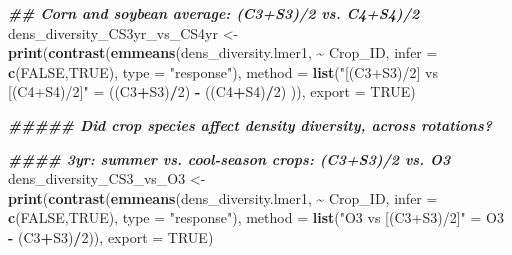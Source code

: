\documentclass[
]{article}
\newenvironment{Shaded}{\begin{snugshade}}{\end{snugshade}}
\newcommand{\AttributeTok}[1]{\textcolor[rgb]{0.13,0.29,0.53}{#1}}
\newcommand{\ConstantTok}[1]{\textcolor[rgb]{0.56,0.35,0.01}{#1}}
\newcommand{\DecValTok}[1]{\textcolor[rgb]{0.00,0.00,0.81}{#1}}
\newcommand{\DocumentationTok}[1]{\textcolor[rgb]{0.56,0.35,0.01}{\textbf{\textit{#1}}}}
\newcommand{\FunctionTok}[1]{\textcolor[rgb]{0.13,0.29,0.53}{\textbf{#1}}}
\newcommand{\NormalTok}[1]{#1}
\newcommand{\OtherTok}[1]{\textcolor[rgb]{0.56,0.35,0.01}{#1}}
\newcommand{\SpecialCharTok}[1]{\textcolor[rgb]{0.81,0.36,0.00}{\textbf{#1}}}
\newcommand{\StringTok}[1]{\textcolor[rgb]{0.31,0.60,0.02}{#1}}
\begin{document}
\begin{Shaded}
\begin{Highlighting}[]
\DocumentationTok{\#\# Corn and soybean average: (C3+S3)/2 vs. C4+S4)/2}
\NormalTok{dens\_diversity\_CS3yr\_vs\_CS4yr }\OtherTok{\textless{}{-}} \FunctionTok{print}\NormalTok{(}\FunctionTok{contrast}\NormalTok{(}\FunctionTok{emmeans}\NormalTok{(dens\_diversity.lmer1, }\SpecialCharTok{\textasciitilde{}}\NormalTok{ Crop\_ID,}
                                                        \AttributeTok{infer =} \FunctionTok{c}\NormalTok{(}\ConstantTok{FALSE}\NormalTok{,}\ConstantTok{TRUE}\NormalTok{), }
                                                        \AttributeTok{type =} \StringTok{"response"}\NormalTok{),}
                                                \AttributeTok{method =} \FunctionTok{list}\NormalTok{(}\StringTok{"[(C3+S3)/2] vs [(C4+S4)/2]"} \OtherTok{=}
\NormalTok{                                                                ((C3}\SpecialCharTok{+}\NormalTok{S3)}\SpecialCharTok{/}\DecValTok{2}\NormalTok{) }\SpecialCharTok{{-}}\NormalTok{ ((C4}\SpecialCharTok{+}\NormalTok{S4)}\SpecialCharTok{/}\DecValTok{2}\NormalTok{) )),}
                                       \AttributeTok{export =} \ConstantTok{TRUE}\NormalTok{)}


\DocumentationTok{\#\#\#\#\# Did crop species affect density diversity, across rotations?}

\DocumentationTok{\#\#\#\# 3yr: summer vs. cool{-}season crops: (C3+S3)/2 vs. O3}
\NormalTok{dens\_diversity\_CS3\_vs\_O3 }\OtherTok{\textless{}{-}} \FunctionTok{print}\NormalTok{(}\FunctionTok{contrast}\NormalTok{(}\FunctionTok{emmeans}\NormalTok{(dens\_diversity.lmer1, }\SpecialCharTok{\textasciitilde{}}\NormalTok{ Crop\_ID, }
                                                   \AttributeTok{infer =} \FunctionTok{c}\NormalTok{(}\ConstantTok{FALSE}\NormalTok{,}\ConstantTok{TRUE}\NormalTok{), }
                                                   \AttributeTok{type =} \StringTok{"response"}\NormalTok{),}
                                           \AttributeTok{method =} \FunctionTok{list}\NormalTok{(}\StringTok{"O3 vs [(C3+S3)/2]"} \OtherTok{=}\NormalTok{ O3 }\SpecialCharTok{{-}}\NormalTok{ (C3}\SpecialCharTok{+}\NormalTok{S3)}\SpecialCharTok{/}\DecValTok{2}\NormalTok{)),}
                                  \AttributeTok{export =} \ConstantTok{TRUE}\NormalTok{)}


\end{Highlighting}
\end{Shaded}
\end{document}
